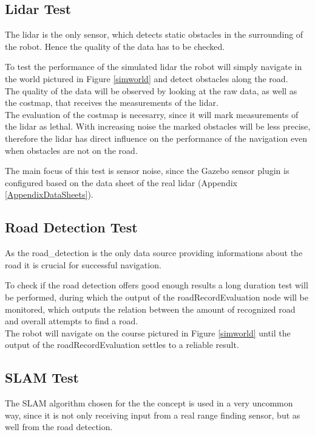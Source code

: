 \subsection{Lidar Test}
The lidar is the only sensor, which detects static obstacles in the surrounding of the robot. Hence the quality of the data has to be checked.

To test the performance of the simulated lidar the robot will simply navigate in the world pictured in Figure \ref{simworld} and detect obstacles along the road.\\

The quality of the data will be observed by looking at the raw data, as well as the costmap, that receives the measurements of the lidar.\\

The evaluation of the costmap is necesarry, since it will mark measurements of the lidar as lethal. With increasing noise the marked obstacles will be less precise, therefore the lidar has direct influence on the performance of the navigation even when obstacles are not on the road.

The main focus of this test is sensor noise, since the Gazebo sensor plugin is configured based on the data sheet of the real lidar (Appendix \ref{AppendixDataSheets}).

\subsection{Road Detection Test}
As the road\_detection is the only data source providing informations about the road it is crucial for successful navigation.

To check if the road detection offers good enough results a long duration test will be performed, during which the output of the roadRecordEvaluation node will be monitored, which outputs the relation between the amount of recognized road and overall attempts to find a road.\\

The robot will navigate on the course pictured in Figure \ref{simworld} until the output of the roadRecordEvaluation settles to a reliable result.

\subsection{SLAM Test}
The SLAM algorithm chosen for the the concept is used in a very uncommon way, since it is not only receiving input from a real range finding sensor, but as well from the road detection.


